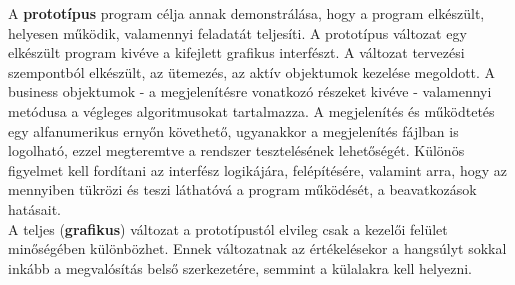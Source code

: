 \noindent A \textbf{prototípus} program célja annak demonstrálása, hogy a program elkészült, helyesen működik, valamennyi feladatát teljesíti. A prototípus változat egy elkészült program kivéve a kifejlett grafikus interfészt. A változat tervezési szempontból elkészült, az ütemezés, az aktív objektumok kezelése megoldott. A business objektumok - a megjelenítésre vonatkozó részeket kivéve - valamennyi metódusa a végleges algoritmusokat tartalmazza. A megjelenítés és működtetés egy alfanumerikus ernyőn
követhető, ugyanakkor a megjelenítés fájlban is logolható, ezzel megteremtve a rendszer tesztelésének lehetőségét. Különös figyelmet kell fordítani az interfész logikájára, felépítésére, valamint arra, hogy az mennyiben tükrözi és teszi láthatóvá a program működését, a beavatkozások hatásait. \\

\noindent A teljes (\textbf{grafikus}) változat a prototípustól elvileg csak a kezelői felület minőségében különbözhet. Ennek változatnak az értékelésekor a hangsúlyt sokkal inkább a megvalósítás belső szerkezetére, semmint a külalakra kell helyezni.
